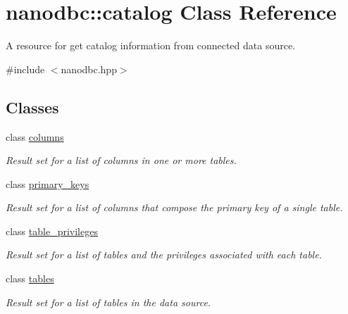 \hypertarget{classnanodbc_1_1catalog}{}\section{nanodbc\+::catalog Class Reference}
\label{classnanodbc_1_1catalog}


A resource for get catalog information from connected data source.  




{\ttfamily \#include $<$nanodbc.\+hpp$>$}

\subsection*{Classes}
\begin{DoxyCompactItemize}
\item 
class \mbox{\hyperlink{classnanodbc_1_1catalog_1_1columns}{columns}}
\begin{DoxyCompactList}\small\item\em Result set for a list of columns in one or more tables. \end{DoxyCompactList}\item 
class \mbox{\hyperlink{classnanodbc_1_1catalog_1_1primary__keys}{primary\+\_\+keys}}
\begin{DoxyCompactList}\small\item\em Result set for a list of columns that compose the primary key of a single table. \end{DoxyCompactList}\item 
class \mbox{\hyperlink{classnanodbc_1_1catalog_1_1table__privileges}{table\+\_\+privileges}}
\begin{DoxyCompactList}\small\item\em Result set for a list of tables and the privileges associated with each table. \end{DoxyCompactList}\item 
class \mbox{\hyperlink{classnanodbc_1_1catalog_1_1tables}{tables}}
\begin{DoxyCompactList}\small\item\em Result set for a list of tables in the data source. \end{DoxyCompactList}\end{DoxyCompactItemize}
